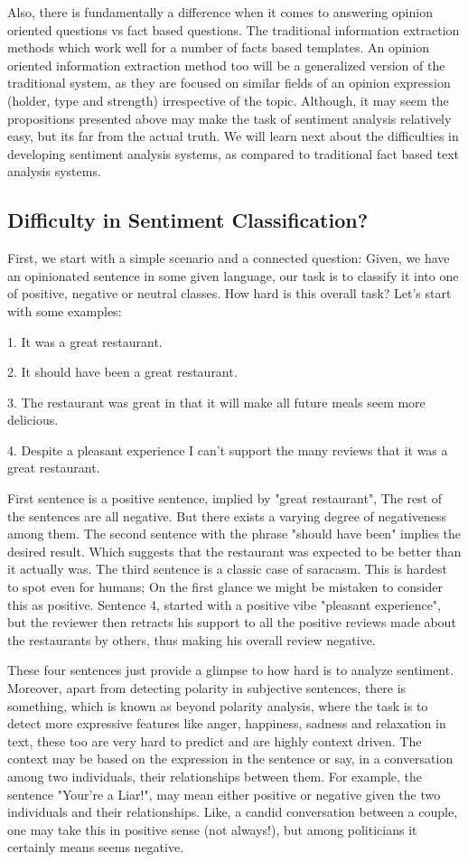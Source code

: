 Also, there is fundamentally a difference when it comes to answering opinion oriented questions vs fact based questions. The traditional information extraction methods which work well for a number of facts based templates. An opinion oriented information extraction method too will be a generalized version of the traditional system, as they are focused on similar fields of an opinion expression (holder, type and strength) irrespective of the topic. Although, it may seem the propositions presented above may make the task of sentiment analysis relatively easy, but its far from the actual truth. We will learn next about the difficulties in developing sentiment analysis systems, as compared to traditional fact based text analysis systems.

\subsection{Difficulty in Sentiment Classification?}
First, we start with a simple scenario and a connected question: Given, we have an opinionated sentence in some given language, our task is to classify it into one of positive, negative or neutral classes. How hard is this overall task?
Let's start with some examples:

1. It was a great restaurant.

2. It should have been a great restaurant.

3. The restaurant was great in that it will make all future meals seem more delicious.

4. Despite a pleasant experience I can’t support the many reviews that it was a great restaurant.

First sentence is a positive sentence, implied by "great restaurant", The rest of the sentences are all negative. But there exists a varying degree of negativeness among them. The second sentence with the phrase "should have been" implies the desired result. Which suggests that the restaurant was expected to be better than it actually was. The third sentence is a classic case of saracasm. This is hardest to spot even for humans; On the first glance we might be mistaken to consider this as positive. Sentence 4, started with a positive vibe "pleasant experience", but the reviewer then retracts his support to all the positive reviews made about the restaurants by others, thus making his overall review negative. 

These four sentences just provide a glimpse to how hard is to analyze sentiment. Moreover, apart from detecting polarity in subjective sentences, there is something, which is known as beyond polarity analysis, where the task is to detect more expressive features like anger, happiness, sadness and relaxation in text, these too are very hard to predict and are highly context driven. The context may be based on the expression in the sentence or say, in a conversation among two individuals, their relationships between them. For example, the sentence "Your're a Liar!", may mean either positive or negative given the two individuals and their relationships. Like, a candid conversation between a couple, one may take this in positive sense (not always!), but among politicians it certainly means seems negative. 

